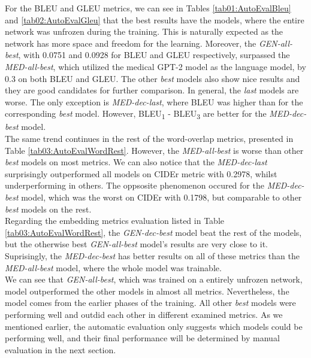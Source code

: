 For the BLEU and GLEU metrics, we can see in Tables \ref{tab01:AutoEvalBleu} and \ref{tab02:AutoEvalGleu} that the best results have the models, where the entire network was unfrozen during the training. This is naturally expected as the network has more space and freedom for the learning. Moreover, the \textit{GEN-all-best}, with 0.0751 and 0.0928 for BLEU and GLEU respectively, surpassed the \textit{MED-all-best}, which utilized the medical GPT-2 model as the language model, by 0.3 on both BLEU and GLEU. The other \textit{best} models also show nice results and they are good candidates for further comparison. In general, the \textit{last} models are worse. The only exception is \textit{MED-dec-last}, where BLEU was higher than for the corresponding \textit{best} model. However, BLEU\textsubscript{1} - BLEU\textsubscript{3} are better for the \textit{MED-dec-best} model.\\ 

The same trend continues in the rest of the word-overlap metrics, presented in Table \ref{tab03:AutoEvalWordRest}. However, the \textit{MED-all-best} is worse than other \textit{best} models on most metrics. We can also notice that the \textit{MED-dec-last} surprisingly outperformed all models on CIDEr metric with 0.2978, whilst underperforming in others. The oppsosite phenomenon occured for the \textit{MED-dec-best} model, which was the worst on CIDEr with 0.1798, but comparable to other \textit{best} models on the rest.\\

Regarding the embedding metrics evaluation listed in Table \ref{tab03:AutoEvalWordRest}, the \textit{GEN-dec-best} model beat the rest of the models, but the otherwise best \textit{GEN-all-best} model's results are very close to it. Suprisingly, the \textit{MED-dec-best} has better results on all of these metrics than the \textit{MED-all-best} model, where the whole model was trainable.\\

We can see that \textit{GEN-all-best}, which was trained on a entirely unfrozen network, model outperformed the other models in almost all metrics. Nevertheless, the model comes from the earlier phases of the training. All other \textit{best} models were performing well and outdid each other in different examined metrics. As we mentioned earlier, the automatic evaluation only suggests which models could be performing well, and their final performance will be determined by manual evaluation in the next section.

